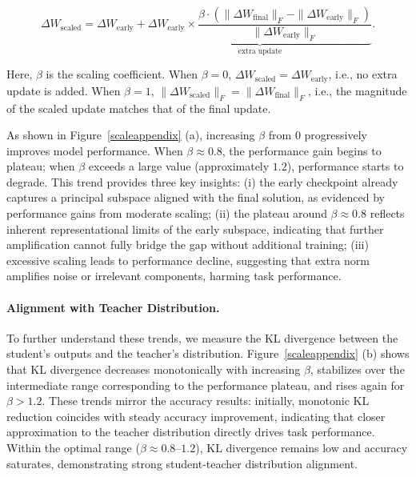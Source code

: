 \documentclass{article}
\begin{document}
\begin{equation}
\Delta W_{\text{scaled}} = \Delta W_{\text{early}} + \underbrace{\Delta W_{\text{early}} \times \frac{\beta \cdot (\|\Delta W_{\text{final}}\|_F - \|\Delta W_{\text{early}}\|_F)}{\|\Delta W_{\text{early}}\|_F}}_{\text{extra update}}.
\end{equation}

Here, \(\beta\) is the scaling coefficient. When \(\beta = 0\), \(\Delta W_{\text{scaled}} = \Delta W_{\text{early}}\), i.e., no extra update is added. When \(\beta = 1\), \(\|\Delta W_{\text{scaled}}\|_F = \|\Delta W_{\text{final}}\|_F\), i.e., the magnitude of the scaled update matches that of the final update.



As shown in Figure~\ref{scaleappendix} (a), increasing $\beta$ from 0 progressively improves model performance. When $\beta \approx 0.8$, the performance gain begins to plateau; when $\beta$ exceeds a large value (approximately $1.2$), performance starts to degrade. This trend provides three key insights: (i) the early checkpoint already captures a principal subspace aligned with the final solution, as evidenced by performance gains from moderate scaling; (ii) the plateau around $\beta \approx 0.8$ reflects inherent representational limits of the early subspace, indicating that further amplification cannot fully bridge the gap without additional training; (iii) excessive scaling leads to performance decline, suggesting that extra norm amplifies noise or irrelevant components, harming task performance.

\paragraph{Alignment with Teacher Distribution.} 
To further understand these trends, we measure the KL divergence between the student’s outputs and the teacher’s distribution. Figure~\ref{scaleappendix} (b) shows that KL divergence decreases monotonically with increasing $\beta$, stabilizes over the intermediate range corresponding to the performance plateau, and rises again for $\beta > 1.2$. These trends mirror the accuracy results: initially, monotonic KL reduction coincides with steady accuracy improvement, indicating that closer approximation to the teacher distribution directly drives task performance. Within the optimal range ($\beta \approx 0.8$--$1.2$), KL divergence remains low and accuracy saturates, demonstrating strong student-teacher distribution alignment.
\end{document}
